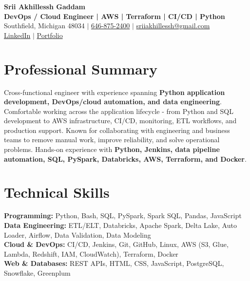 \documentclass[letterpaper,10pt]{article}
\begin{document}
\fontsize{9.35pt}{10.45pt}\selectfont

\begin{center}
    {\LARGE \textbf{Srii Akhillessh Gaddam}} \\[-1pt]
    \textbf{DevOps / Cloud Engineer | AWS | Terraform | CI/CD | Python} \\[2pt]
    Southfield, Michigan 48034 $|$
    \href{tel:6468752400}{646-875-2400} $|$
    \href{mailto:sriiakhillessh@gmail.com}{sriiakhillessh@gmail.com} \\[1pt]
    \href{https://www.linkedin.com/in/srii-akhiilessh-gaddam-b48668191/}{LinkedIn} $|$
    \href{https://sriiakhillesshg.github.io/portfolio/}{Portfolio}
\end{center}
\vspace{-8pt}

\section{Professional Summary}
\small{Cross-functional engineer with experience spanning \textbf{Python application development, DevOps/cloud automation, and data engineering}. Comfortable working across the application lifecycle - from Python and SQL development to AWS infrastructure, CI/CD, monitoring, ETL workflows, and production support. Known for collaborating with engineering and business teams to remove manual work, improve reliability, and solve operational problems. Hands-on experience with \textbf{Python, Jenkins, data pipeline automation, SQL, PySpark, Databricks, AWS, Terraform, and Docker}.}

\section{Technical Skills}
\small{
\textbf{Programming:} Python, Bash, SQL, PySpark, Spark SQL, Pandas, JavaScript \\
\textbf{Data Engineering:} ETL/ELT, Databricks, Apache Spark, Delta Lake, Auto Loader, Airflow, Data Validation, Data Modeling \\
\textbf{Cloud \& DevOps:} CI/CD, Jenkins, Git, GitHub, Linux, AWS (S3, Glue, Lambda, Redshift, IAM, CloudWatch), Terraform, Docker \\
\textbf{Web \& Databases:} REST APIs, HTML, CSS, JavaScript, PostgreSQL, Snowflake, Greenplum
}
\end{document}
